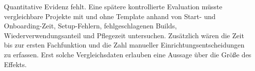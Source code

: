 Quantitative Evidenz fehlt. Eine spätere kontrollierte Evaluation müsste
vergleichbare Projekte mit und ohne Template anhand von Start- und
Onboarding-Zeit, Setup-Fehlern, fehlgeschlagenen Builds, Wiederverwendungsanteil
und Pflegezeit untersuchen.
Zusätzlich wären die Zeit bis zur ersten Fachfunktion und die Zahl manueller
Einrichtungsentscheidungen zu erfassen. Erst solche Vergleichsdaten erlauben
eine Aussage über die Größe des Effekts.
